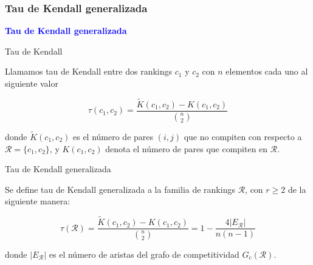\documentclass[10pt,hyperref={unicode}]{beamer}
\begin{document}
	\subsubsection{Tau de Kendall generalizada}
	
	\begin{frame}
		\begin{center}
			\Huge\textbf{\textsf{\textcolor{blue}{Tau de Kendall generalizada}}}
		\end{center}
	\end{frame}
	
	\begin{frame}{Tau de Kendall}
		\begin{defi}
			Llamamos tau de Kendall entre dos rankings $c_1$ y $c_2$ con $n$ elementos cada uno al siguiente valor
			
			\begin{equation}
			\tau(c_1, c_2) = \dfrac{\tilde{K}(c_1, c_2) - K(c_1, c_2)}{\binom{n}{2}}
			\end{equation} 
			
			donde $\tilde{K}(c_1, c_2)$ es el número de pares $(i,j)$ que no compiten con respecto a $\mathcal{R} = \{c_1, c_2\}$, y $K(c_1, c_2)$ denota el número de pares que compiten en $\mathcal{R}$.
		\end{defi}
	\end{frame}
	
	\begin{frame}{Tau de Kendall generalizada}
		\begin{defi}
			Se define tau de Kendall generalizada a la familia de rankings $\mathcal{R}$, con $r \geq 2$ de la siguiente manera:
			
			\begin{equation}
			\tau(\mathcal{R}) = \dfrac{\tilde{K}(c_1, c_2) - K(c_1, c_2)}{\binom{n}{2}} = 1 - \dfrac{4 |E_\mathcal{R}|}{n(n-1)}
			\end{equation}
			
			donde $|E_\mathcal{R}|$ es el número de aristas del grafo de competitividad $G_c(\mathcal{R})$.
		\end{defi}
		
	\end{frame}
	
\end{document}
